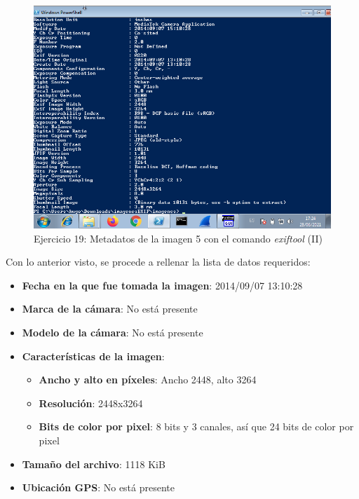\documentclass[11pt]{article}
\begin{document}
\begin{figure}[H]
    \caption{Ejercicio 19: Metadatos de la imagen 5 con el comando \textit{exiftool} (II)}
    \centering
    \includegraphics[scale=0.7]{p03/e19-12.png}
\end{figure}

Con lo anterior visto, se procede a rellenar la lista de datos requeridos:

\begin{itemize}
    \item \textbf{Fecha en la que fue tomada la imagen}: 2014/09/07 13:10:28 
    \item \textbf{Marca de la cámara}: No está presente
    \item \textbf{Modelo de la cámara}: No está presente
    \item \textbf{Características de la imagen}:
        \begin{itemize}
            \item \textbf{Ancho y alto en píxeles}: Ancho 2448, alto 3264
            \item \textbf{Resolución}: 2448x3264
            \item \textbf{Bits de color por pixel}: 8 bits y 3 canales, así que 24 bits de color por pixel
        \end{itemize}
    \item \textbf{Tamaño del archivo}: 1118 KiB
    \item \textbf{Ubicación GPS}: No está presente
\end{itemize}
\end{document}
